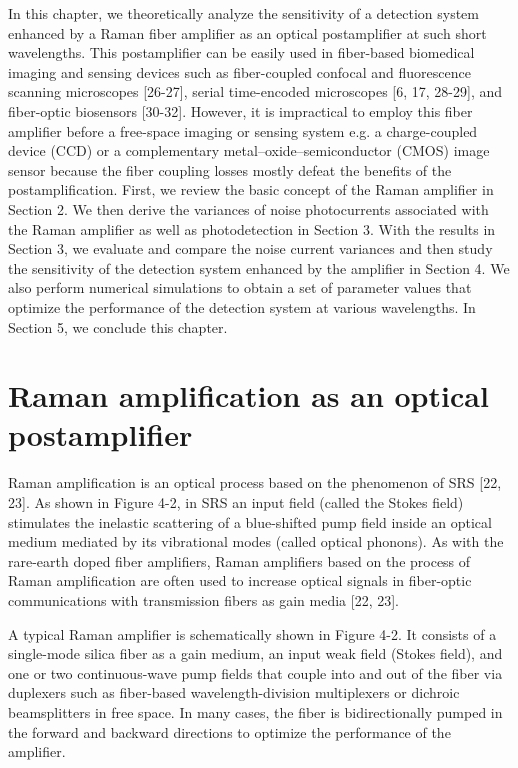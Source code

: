 In this chapter, we theoretically analyze the sensitivity of a detection system enhanced by a Raman fiber amplifier as an optical postamplifier at such short wavelengths. This postamplifier can be easily used in fiber-based biomedical imaging and sensing devices such as fiber-coupled confocal and fluorescence scanning microscopes [26-27], serial time-encoded microscopes [6, 17, 28-29], and fiber-optic biosensors [30-32]. However, it is impractical to employ this fiber amplifier before a free-space imaging or sensing system e.g. a charge-coupled device (CCD) or a complementary metal–oxide–semiconductor (CMOS) image sensor because the fiber coupling losses mostly defeat the benefits of the postamplification. First, we review the basic concept of the Raman amplifier in Section 2. We then derive the variances of noise photocurrents associated with the Raman amplifier as well as photodetection in Section 3. With the results in Section 3, we evaluate and compare the noise current variances and then study the sensitivity of the detection system enhanced by the amplifier in Section 4. We also perform numerical simulations to obtain a set of parameter values that optimize the performance of the detection system at various wavelengths. In Section 5, we conclude this chapter.

\section{Raman amplification as an optical postamplifier}

Raman amplification is an optical process based on the phenomenon of SRS [22, 23]. As shown in Figure 4-2, in SRS an input field (called the Stokes field) stimulates the inelastic scattering of a blue-shifted pump field inside an optical medium mediated by its vibrational modes (called optical phonons). As with the rare-earth doped fiber amplifiers, Raman amplifiers based on the process of Raman amplification are often used to increase optical signals in fiber-optic communications with transmission fibers as gain media [22, 23].

A typical Raman amplifier is schematically shown in Figure 4-2. It consists of a single-mode silica fiber as a gain medium, an input weak field (Stokes field), and one or two continuous-wave pump fields that couple into and out of the fiber via duplexers such as fiber-based wavelength-division multiplexers or dichroic beamsplitters in free space. In many cases, the fiber is bidirectionally pumped in the forward and backward directions to optimize the performance of the amplifier.

